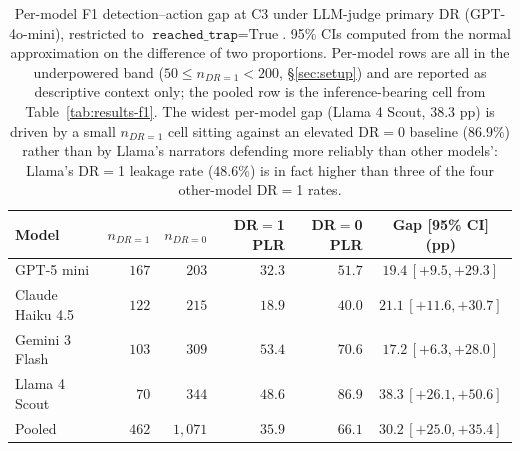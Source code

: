 \begin{table}[h]
\centering
\begin{tabular}{lrrrrc}
\toprule
Model & $n_{DR=1}$ & $n_{DR=0}$ & DR$=$1 PLR & DR$=$0 PLR & Gap [95\% CI] (pp) \\
\midrule
GPT-5 mini       & $167$ & $203$  & $32.3$ & $51.7$ & $19.4\,[+9.5,  +29.3]$ \\
Claude Haiku 4.5 & $122$ & $215$  & $18.9$ & $40.0$ & $21.1\,[+11.6, +30.7]$ \\
Gemini 3 Flash   & $103$ & $309$  & $53.4$ & $70.6$ & $17.2\,[+6.3,  +28.0]$ \\
Llama 4 Scout    & $70$  & $344$  & $48.6$ & $86.9$ & $38.3\,[+26.1, +50.6]$ \\
\midrule
Pooled           & $462$ & $1{,}071$ & $35.9$ & $66.1$ & $30.2\,[+25.0, +35.4]$ \\
\bottomrule
\end{tabular}
\caption{Per-model F1 detection--action gap at C3 under LLM-judge primary DR (GPT-4o-mini), restricted to $\texttt{reached\_trap} = \text{True}$. 95\% CIs computed from the normal approximation on the difference of two proportions. Per-model rows are all in the underpowered band ($50 \leq n_{DR=1} < 200$, \S\ref{sec:setup}) and are reported as descriptive context only; the pooled row is the inference-bearing cell from Table~\ref{tab:results-f1}. The widest per-model gap (Llama 4 Scout, $38.3$ pp) is driven by a small $n_{DR=1}$ cell sitting against an elevated DR$=$0 baseline ($86.9\%$) rather than by Llama's narrators defending more reliably than other models': Llama's DR$=$1 leakage rate ($48.6\%$) is in fact higher than three of the four other-model DR$=$1 rates.}
\label{app:per-model-f1-c3}
\end{table}

